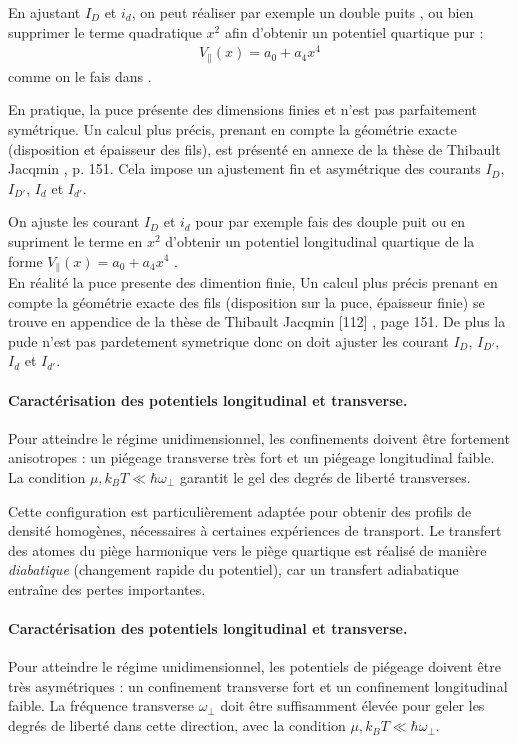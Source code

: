  En ajustant $I_D$ et $i_d$, on peut réaliser par exemple un double puits \cite{Schemmer2019}, ou bien supprimer le terme quadratique $x^2$ afin d’obtenir un potentiel quartique pur :
\begin{eqnarray*}
	V_\parallel(x) = a_0 + a_4 x^4 	
\end{eqnarray*}
comme on le fais dans \cite{Dubois2025}.

En pratique, la puce présente des dimensions finies et n’est pas parfaitement symétrique. Un calcul plus précis, prenant en compte la géométrie exacte (disposition et épaisseur des fils), est présenté en annexe de la thèse de Thibault Jacqmin \cite{???}, p. 151. Cela impose un ajustement fin et asymétrique des courants $I_D$, $I_{D'}$, $I_d$ et $I_{d'}$.


On ajuste les courant $I_D$ et $i_d$ pour par exemple fais des douple puit \cite{Schemmer2019} ou en supriment le terme en $x^2$  d’obtenir un potentiel longitudinal quartique de la forme $V_\parallel(x) = a_0 + a_4 x^4$ \cite{Dubois2025}.\\

En réalité la puce presente des dimention finie, Un calcul plus précis prenant en compte la géométrie exacte des fils (disposition sur la
puce, épaisseur finie) se trouve en appendice de la thèse de Thibault Jacqmin [112] , page 151. De plus la pude n'est pas pardetement symetrique donc on doit ajuster les courant $I_D$, $I_{D'}$, $I_d$ et $I_{d'}$.


\paragraph{Caractérisation des potentiels longitudinal et transverse.}
Pour atteindre le régime unidimensionnel, les confinements doivent être fortement anisotropes : un piégeage transverse très fort et un piégeage longitudinal faible. La condition \(\mu, k_B T \ll \hbar \omega_\perp\) garantit le gel des degrés de liberté transverses.

\medskip

Cette configuration est particulièrement adaptée pour obtenir des profils de densité homogènes, nécessaires à certaines expériences de transport. Le transfert des atomes du piège harmonique vers le piège quartique est réalisé de manière \emph{diabatique} (changement rapide du potentiel), car un transfert adiabatique entraîne des pertes importantes.

\paragraph{Caractérisation des potentiels longitudinal et transverse.}
Pour atteindre le régime unidimensionnel, les potentiels de piégeage doivent être très asymétriques : un confinement transverse fort et un confinement longitudinal faible. La fréquence transverse \(\omega_\perp\) doit être suffisamment élevée pour geler les degrés de liberté dans cette direction, avec la condition \(\mu, k_B T \ll \hbar \omega_\perp\).

